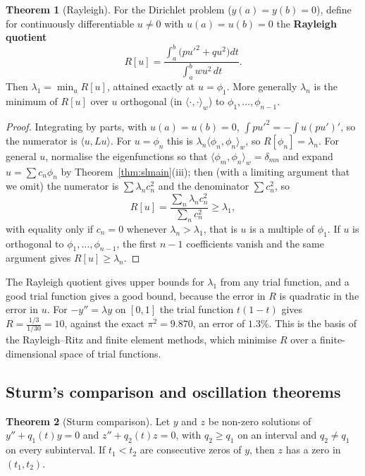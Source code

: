 \documentclass[11pt,a4paper]{article}
\numberwithin{equation}{section}
\theoremstyle{definition}
\newtheorem{thm}{Theorem}[subsection]
\begin{document}
\begin{thm}[Rayleigh]
\label{thm:rayleigh}
For the Dirichlet problem ($y(a) = y(b) = 0$), define for continuously differentiable $u \neq 0$ with $u(a) = u(b) = 0$ the \textbf{Rayleigh quotient}
\[
R[u] = \frac{\int_a^b\bigl(pu'^2 + qu^2\bigr)dt}{\int_a^bwu^2\,dt} .
\]
Then $\lambda_1 = \min_uR[u]$, attained exactly at $u = \phi_1$. More generally $\lambda_n$ is the minimum of $R[u]$ over $u$ orthogonal (in $\langle\cdot,\cdot\rangle_w$) to $\phi_1, \dots, \phi_{n-1}$.
\end{thm}

\begin{proof}
Integrating by parts, with $u(a) = u(b) = 0$, $\int pu'^2 = -\int u(pu')' $, so the numerator is $\langle u, Lu\rangle$. For $u = \phi_n$ this is $\lambda_n\langle\phi_n, \phi_n\rangle_w$, so $R[\phi_n] = \lambda_n$. For general $u$, normalise the
eigenfunctions so that $\langle\phi_m, \phi_n\rangle_w = \delta_{mn}$ and expand $u = \sum c_n\phi_n$ by Theorem~\ref{thm:slmain}(iii); then (with a limiting argument that we omit) the numerator is $\sum\lambda_nc_n^2$ and the denominator
$\sum c_n^2$, so
\[
R[u] = \frac{\sum_n\lambda_nc_n^2}{\sum_nc_n^2} \geq \lambda_1 ,
\]
with equality only if $c_n = 0$ whenever $\lambda_n > \lambda_1$, that is $u$ is a multiple of $\phi_1$. If $u$ is orthogonal to $\phi_1, \dots, \phi_{n-1}$, the first $n - 1$ coefficients vanish and the same argument gives
$R[u] \geq \lambda_n$.
\end{proof}

The Rayleigh quotient gives upper bounds for $\lambda_1$ from any trial function, and a good trial function gives a good bound, because the error in $R$ is quadratic in the error in $u$. For
$-y'' = \lambda y$ on $[0, 1]$ the trial function $t(1 - t)$ gives $R = \frac{1/3}{1/30} = 10$, against the exact $\pi^2 = 9.870$, an error of $1.3\%$. This is the basis of the Rayleigh--Ritz and finite element methods, which
minimise $R$ over a finite-dimensional space of trial functions.

\subsection{Sturm's comparison and oscillation theorems}
\label{ssec:sturmcomp}

\begin{thm}[Sturm comparison]
\label{thm:sturmcomp}
Let $y$ and $z$ be non-zero solutions of $y'' + q_1(t)y = 0$ and $z'' + q_2(t)z = 0$, with $q_2 \geq q_1$ on an interval and $q_2 \neq q_1$ on every subinterval. If $t_1 < t_2$ are consecutive zeros of $y$,
then $z$ has a zero in $(t_1, t_2)$.
\end{thm}
\end{document}
